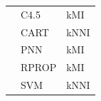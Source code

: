 \begin{table}
\begin{tabular}{|l|l|l|}
		\cline{2-3}
		& C4.5            & kMI                                \\ 
		\cline{2-3}
		& CART            & kNNI                               \\ 
		\cline{2-3}
		& PNN             & kMI                                \\ 
		\cline{2-3}
		& RPROP           & kMI                            \\ 
		\cline{2-3}
		& SVM             & kNNI                               \\
		\hline
	\end{tabular}
\end{table}

